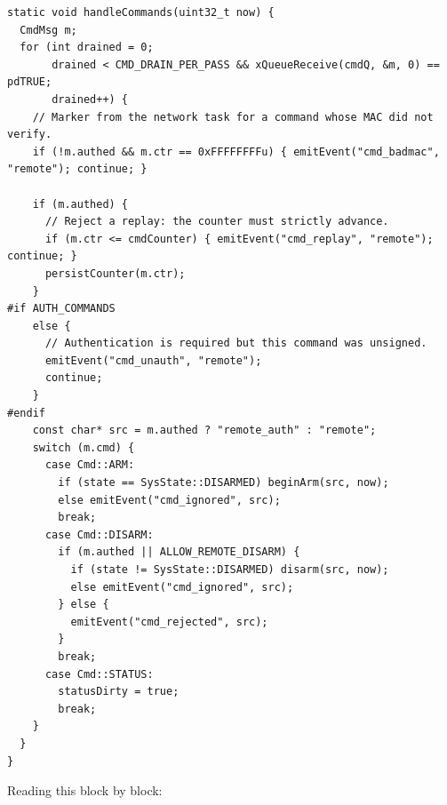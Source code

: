 \begin{lstlisting}[style=cpp,caption={Command dispatch, \code{handleCommands()} in
\code{smart\_home.ino}},label={lst:handlecmd}]
static void handleCommands(uint32_t now) {
  CmdMsg m;
  for (int drained = 0;
       drained < CMD_DRAIN_PER_PASS && xQueueReceive(cmdQ, &m, 0) == pdTRUE;
       drained++) {
    // Marker from the network task for a command whose MAC did not verify.
    if (!m.authed && m.ctr == 0xFFFFFFFFu) { emitEvent("cmd_badmac", "remote"); continue; }

    if (m.authed) {
      // Reject a replay: the counter must strictly advance.
      if (m.ctr <= cmdCounter) { emitEvent("cmd_replay", "remote"); continue; }
      persistCounter(m.ctr);
    }
#if AUTH_COMMANDS
    else {
      // Authentication is required but this command was unsigned.
      emitEvent("cmd_unauth", "remote");
      continue;
    }
#endif
    const char* src = m.authed ? "remote_auth" : "remote";
    switch (m.cmd) {
      case Cmd::ARM:
        if (state == SysState::DISARMED) beginArm(src, now);
        else emitEvent("cmd_ignored", src);
        break;
      case Cmd::DISARM:
        if (m.authed || ALLOW_REMOTE_DISARM) {
          if (state != SysState::DISARMED) disarm(src, now);
          else emitEvent("cmd_ignored", src);
        } else {
          emitEvent("cmd_rejected", src);
        }
        break;
      case Cmd::STATUS:
        statusDirty = true;
        break;
    }
  }
}
\end{lstlisting}

Reading this block by block:

